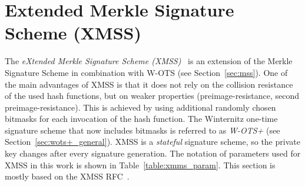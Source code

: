 

\section{Extended Merkle Signature Scheme (XMSS)}
\label{sec:xmss}
The \textit{eXtended Merkle Signature Scheme (XMSS)}~\cite{xmss_RFC8391} is an extension of the Merkle Signature Scheme in combination with W-OTS (see Section~\ref{sec:mss}). One of the main advantages of XMSS is that it does not rely on the collision resistance of the used hash functions, but on weaker properties (preimage-resistance, second preimage-resistance). This is achieved by using additional randomly chosen bitmasks for each invocation of the hash function.
The Winternitz one-time signature scheme that now includes bitmasks is referred to as \textit{W-OTS+} (see Section~\ref{sec:wots+_general}). XMSS is a \textit{stateful} signature scheme, so the private key changes after every signature generation. The notation of parameters used for XMSS in this work is shown in Table~\ref{table:xmms_param}. This section is mostly based on the XMSS RFC~\cite{xmss_RFC8391}.


